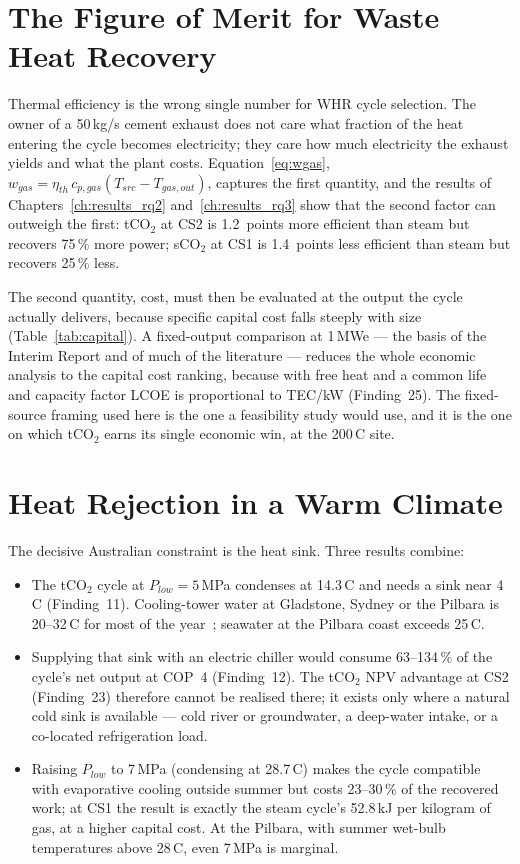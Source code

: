 \section{The Figure of Merit for Waste Heat Recovery}
\label{sec:discussion_fom}

Thermal efficiency is the wrong single number for WHR cycle selection. The
owner of a 50\,kg/s cement exhaust does not care what fraction of the
heat entering the cycle becomes electricity; they care how much electricity
the exhaust yields and what the plant costs. Equation~\eqref{eq:wgas},
$w_{gas} = \eta_{th}\,c_{p,gas}(T_{src} - T_{gas,out})$, captures the first
quantity, and the results of Chapters~\ref{ch:results_rq2}
and~\ref{ch:results_rq3} show that the second factor can outweigh the
first: tCO$_2$ at CS2 is 1.2~points more efficient than steam but recovers
75\,\% more power; sCO$_2$ at CS1 is 1.4~points less efficient than steam but
recovers 25\,\% less.

The second quantity, cost, must then be evaluated at the output the cycle
actually delivers, because specific capital cost falls steeply with size
(Table~\ref{tab:capital}). A fixed-output comparison at 1\,MWe --- the basis
of the Interim Report and of much of the literature --- reduces the whole
economic analysis to the capital cost ranking, because with free heat and a
common life and capacity factor LCOE is proportional to TEC/kW
(Finding~25). The fixed-source framing used here is the one a feasibility
study would use, and it is the one on which tCO$_2$ earns its single
economic win, at the 200\,\textdegree C site.

\section{Heat Rejection in a Warm Climate}
\label{sec:discussion_australian}

The decisive Australian constraint is the heat sink. Three results combine:

\begin{itemize}[leftmargin=1.5em,itemsep=3pt]
\item The tCO$_2$ cycle at $P_{low} = 5$\,MPa condenses at 14.3\,\textdegree C
and needs a sink near 4\,\textdegree C (Finding~11). Cooling-tower water at
Gladstone, Sydney or the Pilbara is 20--32\,\textdegree C for most of the
year~\cite{BOM2024}; seawater at the Pilbara coast exceeds 25\,\textdegree C.
\item Supplying that sink with an electric chiller would consume 63--134\,\%
of the cycle's net output at COP~4 (Finding~12). The tCO$_2$ NPV advantage
at CS2 (Finding~23) therefore cannot be realised there; it exists only where
a natural cold sink is available --- cold river or groundwater, a deep-water
intake, or a co-located refrigeration load.
\item Raising $P_{low}$ to 7\,MPa (condensing at 28.7\,\textdegree C) makes
the cycle compatible with evaporative cooling outside summer but costs
23--30\,\% of the recovered work; at CS1 the result is exactly the steam
cycle's 52.8\,kJ per kilogram of gas, at a higher capital cost. At the
Pilbara, with summer wet-bulb temperatures above 28\,\textdegree C, even
7\,MPa is marginal.
\end{itemize}

